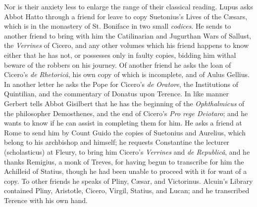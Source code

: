 Nor is their anxiety less to enlarge the range of their classical
reading. Lupus asks Abbot Hatto through a friend for leave to copy
Suetonius's Lives of the Cæsars, which is in the monastery of St.
Boniface in two small \emph{codices}. He sends to another friend to
bring with him the Catilinarian and Jugurthan Wars of Sallust, the \emph{Verrines}
of Cicero, and any other volumes which his friend happens to know
either that he has not, or possesses only in faulty copies, bidding
him withal beware of the robbers on his journey. Of another friend he
asks the loan of Cicero's \emph{de Rhetoricâ}, his own copy of which
is incomplete, and of Aulus Gellius. In another letter he asks the
Pope for Cicero's \emph{de Oratore}, the Institutions of Quintilian,
and the commentary of Donatus upon Terence. In like manner Gerbert
tells Abbot Gisilbert that he has the beginning of the \emph{Ophthalmicus}
of the philosopher Demosthenes, and the end of Cicero's \emph{Pro rege
Deiotaro}; and he wants to know if he can assist in
completing them for him. He asks a friend at Rome to send him by Count
Guido the copies of Suetonius and Aurelius, which belong to his
archbishop and himself; he requests Constantine the lecturer (scholasticus)
at Fleury, to bring him Cicero's \emph{Verrines} and \emph{de Republicâ},
and he thanks Remigius, a monk of Treves, for having begun to
transcribe for him the Achilleid of Statius, though he had been unable
to proceed with it for want of a copy. To other friends he speaks of
Pliny, Cæsar, and Victorinus. Alcuin's Library contained Pliny,
Aristotle, Cicero, Virgil, Statius, and Lucan; and he transcribed
Terence with his own hand.

